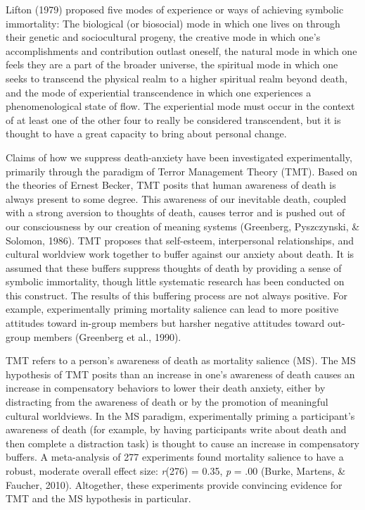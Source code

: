 \documentclass[
  english,
  man]{apa6}
\begin{document}
Lifton (1979) proposed five modes of experience or ways of
achieving symbolic immortality: The biological (or biosocial) mode in
which one lives on through their genetic and sociocultural progeny, the
creative mode in which one's accomplishments and contribution outlast
oneself, the natural mode in which one feels they are a part of the
broader universe, the spiritual mode in which one seeks to transcend the
physical realm to a higher spiritual realm beyond death, and the mode of
experiential transcendence in which one experiences a phenomenological
state of flow. The experiential mode must occur in the context of at
least one of the other four to really be considered transcendent, but it
is thought to have a great capacity to bring about personal change.

Claims of how we suppress death-anxiety have been investigated
experimentally, primarily through the paradigm of Terror Management
Theory (TMT). Based on the theories of Ernest Becker, TMT posits that
human awareness of death is always present to some degree. This
awareness of our inevitable death, coupled with a strong aversion to
thoughts of death, causes terror and is pushed out of our consciousness
by our creation of meaning systems (Greenberg, Pyszczynski, \& Solomon, 1986). TMT proposes that
self-esteem, interpersonal relationships, and cultural worldview work
together to buffer against our anxiety about death. It is assumed that
these buffers suppress thoughts of death by providing a sense of
symbolic immortality, though little systematic research has been
conducted on this construct. The results of this buffering process are
not always positive. For example, experimentally priming mortality
salience can lead to more positive attitudes toward in-group members but
harsher negative attitudes toward out-group members (Greenberg et al., 1990).

TMT refers to a person's awareness of death as mortality salience (MS).
The MS hypothesis of TMT posits than an increase in one's awareness of
death causes an increase in compensatory behaviors to lower their death
anxiety, either by distracting from the awareness of death or by the
promotion of meaningful cultural worldviews. In the MS paradigm,
experimentally priming a participant's awareness of death (for example,
by having participants write about death and then complete a distraction
task) is thought to cause an increase in compensatory buffers. A
meta-analysis of 277 experiments found mortality salience to have a
robust, moderate overall effect size: \emph{r}(276) = 0.35, \emph{p} = .00
(Burke, Martens, \& Faucher, 2010). Altogether, these experiments provide convincing evidence
for TMT and the MS hypothesis in particular.
\end{document}
